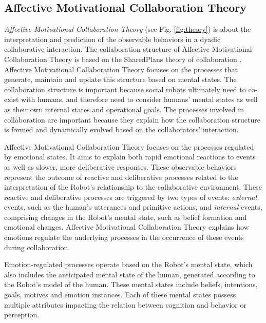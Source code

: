 \subsection{Affective Motivational Collaboration Theory}
\label{sec:AMCT}

\textit{Affective Motivational Collaboration Theory} (see Fig. \ref{fig:theory})
is about the interpretation and prediction of the observable behaviors in a
dyadic collaborative interaction. The collaboration structure of
Affective Motivational Collaboration Theory is based on the SharedPlans theory
of collaboration
\cite{grosz:planning-acting,grosz:collaboration,grosz:plans-discourse}.
Affective Motivational Collaboration Theory focuses on the processes that
generate, maintain and update this structure based on mental states. The
collaboration structure is important because social robots ultimately need to
co-exist with humans, and therefore need to consider humans' mental states as
well as their own internal states and operational goals. The processes involved
in collaboration are important because they explain how the collaboration
structure is formed and dynamically evolved based on the collaborators'
interaction.

Affective Motivational Collaboration Theory focuses on the processes regulated
by emotional states. It aims to explain both rapid emotional reactions to events
as well as slower, more deliberative responses. These observable behaviors
represent the outcome of reactive and deliberative processes related to the
interpretation of the Robot's relationship to the collaborative environment.
These reactive and deliberative processes are triggered by two types of events:
\textit{external} events, such as the human's utterances and primitive actions,
and \textit{internal} events, comprising changes in the Robot's mental state,
such as belief formation and emotional changes. Affective Motivational
Collaboration Theory explains how emotions regulate the underlying processes in
the occurrence of these events during collaboration.

Emotion-regulated processes operate based on the Robot's mental state, which
also includes the anticipated mental state of the human, generated according to
the Robot's model of the human. These mental states include beliefs, intentions,
goals, motives and emotion instances. Each of these mental states possess
multiple attributes impacting the relation between cognition and behavior or
perception.

